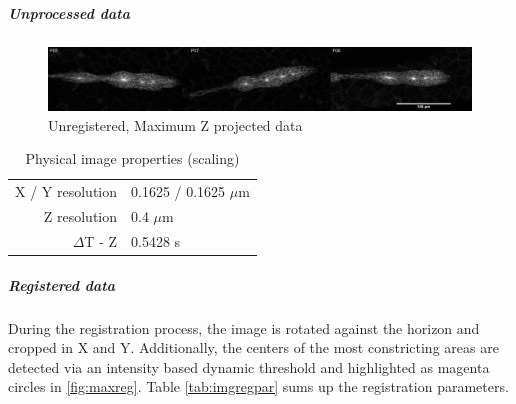 \documentclass[11pt,singlespacinge,twoside]{reedthesis} %
\begin{document}
\hypertarget{unprocessed-data}{%
\subparagraph{Unprocessed data}\label{unprocessed-data}}


\begin{figure}

{\centering \includegraphics[width=0.9\linewidth]{figure/02-MaMo/GrTr/Morphology/zmax_comb_2} 

}

\caption{Unregistered, Maximum Z projected data}\label{fig:maxraw}
\end{figure}
\begin{longtable}[]{@{}rl@{}}
\caption{\label{tab:imgprop} Physical image properties (scaling)}\tabularnewline
\toprule
\endhead
\begin{minipage}[t]{0.46\columnwidth}\raggedleft
X / Y resolution\strut
\end{minipage} & \begin{minipage}[t]{0.46\columnwidth}\raggedright
0.1625 / 0.1625 \(\mu\)m\strut
\end{minipage}\tabularnewline
\begin{minipage}[t]{0.46\columnwidth}\raggedleft
Z resolution\strut
\end{minipage} & \begin{minipage}[t]{0.46\columnwidth}\raggedright
0.4 \(\mu\)m\strut
\end{minipage}\tabularnewline
\begin{minipage}[t]{0.46\columnwidth}\raggedleft
\(\Delta\)T - Z\strut
\end{minipage} & \begin{minipage}[t]{0.46\columnwidth}\raggedright
0.5428 s\strut
\end{minipage}\tabularnewline
\bottomrule
\end{longtable}
\hypertarget{registered-data-1}{%
\subparagraph{Registered data}\label{registered-data-1}}

During the registration process, the image is rotated against the horizon and cropped in X and Y. Additionally, the centers of the most constricting areas are detected via an intensity based dynamic threshold and highlighted as magenta circles in \ref{fig:maxreg}. Table \ref{tab:imgregpar} sums up the registration parameters.
\end{document}
